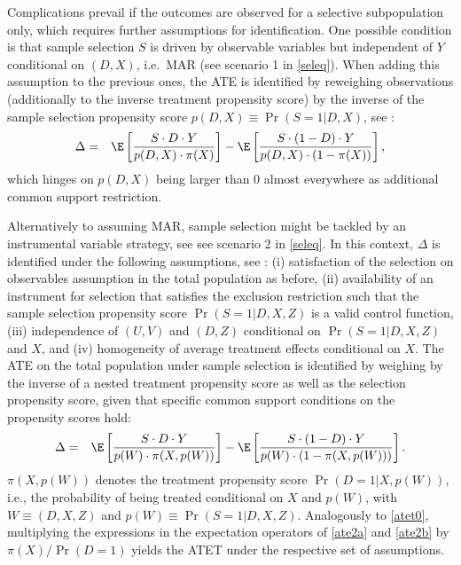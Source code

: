 \documentclass[nojss]{jss}
\begin{document}
Complications prevail if the outcomes are observed for a selective subpopulation only, which requires further assumptions for identification. One possible condition is that sample selection $S$ is driven by observable variables but independent of $Y$ conditional on $(D,X)$, i.e.\ MAR (see scenario 1 in \eqref{seleq}). When adding this assumption to the previous ones, the ATE is identified by reweighing observations (additionally to the inverse treatment propensity score) by the inverse of the sample selection propensity score $p(D,X)\equiv \Pr(S=1|D,X)$, see \citet{Hu12}:
\begin{eqnarray}
\Delta &=& \E\left[ \frac{S \cdot D \cdot Y}{p(D,X)\cdot\pi(X)} \right] - \E\left[ \frac{S \cdot(1-D)\cdot Y}{p(D,X)\cdot(1-\pi(X))} \right],  \label{ate2a}
\end{eqnarray}
which hinges on $p(D,X)$ being larger than 0 almost everywhere as additional common support restriction.

Alternatively to assuming MAR, sample selection might be tackled by an instrumental variable strategy, see see scenario 2 in \eqref{seleq}. In this context, $\Delta$ is identified under the following assumptions, see \citet{Hu14}: (i) satisfaction of the selection on observables assumption in the total population as before, (ii) availability of an instrument for selection that satisfies the exclusion restriction such that the sample selection propensity score $\Pr(S=1|D,X,Z)$ is a valid control function, (iii) independence of $(U,V)$  and $(D,Z)$ conditional on $\Pr(S=1|D,X,Z)$ and $X$, and (iv) homogeneity of average treatment effects conditional on $X$. The ATE on the total population under sample selection is identified by weighing by the inverse of a nested treatment propensity score as well as the selection propensity score, given that specific common support conditions on the propensity scores hold:
\begin{eqnarray}
\Delta &=& \E\left[ \frac{S\cdot D\cdot Y}{p(W)\cdot
\pi(X,p(W))}\right] - \E\left[ \frac{S\cdot (1-D)\cdot Y}{p(W)\cdot (1-\pi(X,p(W)))}\right].  \label{ate2b}
\end{eqnarray}
$\pi(X,p(W))$ denotes the treatment propensity score $\Pr(D=1|X,p(W))$, i.e., the probability of being treated conditional on $X$ and $p(W)$, with $W\equiv(D,X,Z)$ and $p(W) \equiv \Pr(S=1|D,X,Z)$. Analogously to \eqref{atet0}, multiplying the expressions in the expectation operators of \eqref{ate2a} and \eqref{ate2b} by $\pi(X)/\Pr(D=1)$ yields the ATET under the respective set of assumptions.
\end{document}

